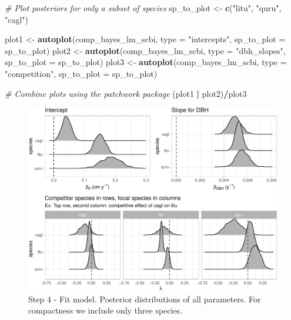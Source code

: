 \documentclass[12pt]{article}
\newenvironment{Shaded}{\begin{snugshade}}{\end{snugshade}}
\newcommand{\CommentTok}[1]{\textcolor[rgb]{0.56,0.35,0.01}{\textit{#1}}}
\newcommand{\DataTypeTok}[1]{\textcolor[rgb]{0.13,0.29,0.53}{#1}}
\newcommand{\KeywordTok}[1]{\textcolor[rgb]{0.13,0.29,0.53}{\textbf{#1}}}
\newcommand{\NormalTok}[1]{#1}
\newcommand{\OperatorTok}[1]{\textcolor[rgb]{0.81,0.36,0.00}{\textbf{#1}}}
\newcommand{\StringTok}[1]{\textcolor[rgb]{0.31,0.60,0.02}{#1}}
\begin{document}
\begin{Shaded}
\begin{Highlighting}[]
\CommentTok{# Plot posteriors for only a subset of species}
\NormalTok{sp_to_plot <-}\StringTok{ }\KeywordTok{c}\NormalTok{(}\StringTok{"litu"}\NormalTok{, }\StringTok{"quru"}\NormalTok{, }\StringTok{"cagl"}\NormalTok{)}

\NormalTok{plot1 <-}\StringTok{ }\KeywordTok{autoplot}\NormalTok{(comp_bayes_lm_scbi, }\DataTypeTok{type =} \StringTok{"intercepts"}\NormalTok{, }\DataTypeTok{sp_to_plot =}\NormalTok{ sp_to_plot)}
\NormalTok{plot2 <-}\StringTok{ }\KeywordTok{autoplot}\NormalTok{(comp_bayes_lm_scbi, }\DataTypeTok{type =} \StringTok{"dbh_slopes"}\NormalTok{, }\DataTypeTok{sp_to_plot =}\NormalTok{ sp_to_plot)}
\NormalTok{plot3 <-}\StringTok{ }\KeywordTok{autoplot}\NormalTok{(comp_bayes_lm_scbi, }\DataTypeTok{type =} \StringTok{"competition"}\NormalTok{, }\DataTypeTok{sp_to_plot =}\NormalTok{ sp_to_plot)}

\CommentTok{# Combine plots using the patchwork package}
\NormalTok{(plot1 }\OperatorTok{|}\StringTok{ }\NormalTok{plot2)}\OperatorTok{/}\NormalTok{plot3}
\end{Highlighting}
\end{Shaded}

\begin{figure}

{\centering \includegraphics[width=1\linewidth]{Figures/scbi-posterior-viz-1} 

}

\caption{Step 4 - Fit model. Posterior distributions of all parameters. For compactness we include only three species.}\label{fig:scbi-posterior-viz}
\end{figure}
\end{document}

